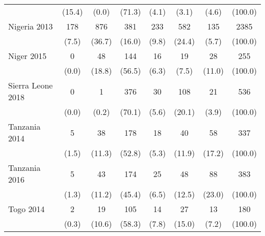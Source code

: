 \begin{tabular}{l*{7}{c}}
&                                              {(15.4)}&      {(0.0)}&         {(71.3)}&                  {(4.1)}&     {(3.1)}&     {(4.6)}&             {(100.0)}\\
Nigeria 2013&                  {178}&                {876}&          {381}&                    {233}&       {582}&               {135}&               {2385}\\
&                                              {(7.5)}&      {(36.7)}&        {(16.0)}&                  {(9.8)}&     {(24.4)}&     {(5.7)}&             {(100.0)}\\
Niger 2015&                    {0}&                {48}&                  {144}&                    {16}&       {19}&               {28}&               {255}\\
&                                              {(0.0)}&      {(18.8)}&        {(56.5)}&                  {(6.3)}&     {(7.5)}&     {(11.0)}&             {(100.0)}\\
Sierra Leone 2018&             {0}&                {1}&          {376}&                    {30}&       {108}&               {21}&               {536}\\
&                                              {(0.0)}&      {(0.2)}&        {(70.1)}&                  {(5.6)}&     {(20.1)}&     {(3.9)}&             {(100.0)}\\
Tanzania 2014&                 {5}&                {38}&          {178}&                    {18}&       {40}&               {58}&               {337}\\
&                                              {(1.5)}&      {(11.3)}&        {(52.8)}&                  {(5.3)}&     {(11.9)}&     {(17.2)}&             {(100.0)}\\
Tanzania 2016&                 {5}&               {43}&          {174}&                    {25}&       {48}&               {88}&               {383}\\
&                                              {(1.3)}&     {(11.2)}&        {(45.4)}&             {(6.5)}&      {(12.5)}&         {(23.0)}&             {(100.0)}\\
Togo 2014&                             {2}&               {19}&          {105}&                    {14}&       {27}&               {13}&               {180}\\
&                                              {(0.3)}&     {(10.6)}&        {(58.3)}&             {(7.8)}&          {(15.0)}&     {(7.2)}&             {(100.0)}\\

\end{tabular}
